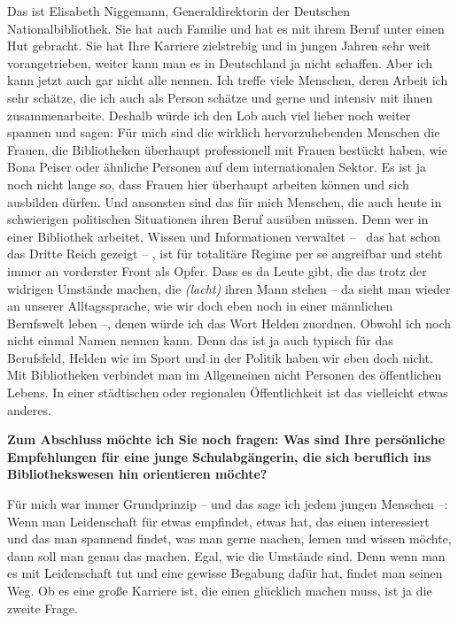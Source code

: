 \documentclass[a4paper,
fontsize=11pt,
oneside,
numbers=noperiodatend,
parskip=half-,
bibliography=totoc,
final
]{scrartcl}
\begin{document}
Das ist Elisabeth Niggemann, Generaldirektorin der Deutschen
Nationalbibliothek. Sie hat auch Familie und hat es mit ihrem Beruf
unter einen Hut gebracht. Sie hat Ihre Karriere zielstrebig und in
jungen Jahren sehr weit vorangetrieben, weiter kann man es in
Deutschland ja nicht schaffen. Aber ich kann jetzt auch gar nicht alle
nennen. Ich treffe viele Menschen, deren Arbeit ich sehr schätze, die
ich auch als Person schätze und gerne und intensiv mit ihnen
zusammenarbeite. Deshalb würde ich den Lob auch viel lieber noch weiter
spannen und sagen: Für mich sind die wirklich hervorzuhebenden Menschen
die Frauen, die Bibliotheken überhaupt professionell mit Frauen bestückt
haben, wie Bona Peiser oder ähnliche Personen auf dem internationalen
Sektor. Es ist ja noch nicht lange so, dass Frauen hier überhaupt
arbeiten können und sich ausbilden dürfen. Und ansonsten sind das für
mich Menschen, die auch heute in schwierigen politischen Situationen
ihren Beruf ausüben müssen. Denn wer in einer Bibliothek arbeitet,
Wissen und Informationen verwaltet --~ das hat schon das Dritte Reich
gezeigt -- , ist für totalitäre Regime per se angreifbar und steht immer
an vorderster Front als Opfer. Dass es da Leute gibt, die das trotz der
widrigen Umstände machen, die \emph{(lacht)} ihren Mann stehen -- da
sieht man wieder an unserer Alltagssprache, wie wir doch eben noch in
einer männlichen Berufswelt leben --, denen würde ich das Wort Helden
zuordnen. Obwohl ich noch nicht einmal Namen nennen kann. Denn das ist
ja auch typisch für das Berufsfeld, Helden wie im Sport und in der
Politik haben wir eben doch nicht. Mit Bibliotheken verbindet man im
Allgemeinen nicht Personen des öffentlichen Lebens. In einer städtischen
oder regionalen Öffentlichkeit ist das vielleicht etwas anderes.

\textbf{Zum Abschluss möchte ich Sie noch fragen: Was sind Ihre
persönliche Empfehlungen für eine junge Schulabgängerin, die sich
beruflich ins Bibliothekswesen hin orientieren möchte?}

Für mich war immer Grundprinzip -- und das sage ich jedem jungen
Menschen --: Wenn man Leidenschaft für etwas empfindet, etwas hat, das
einen interessiert und das man spannend findet, was man gerne machen,
lernen und wissen möchte, dann soll man genau das machen. Egal, wie die
Umstände sind. Denn wenn man es mit Leidenschaft tut und eine gewisse
Begabung dafür hat, findet man seinen Weg. Ob es eine große Karriere
ist, die einen glücklich machen muss, ist ja die zweite Frage.
\end{document}
